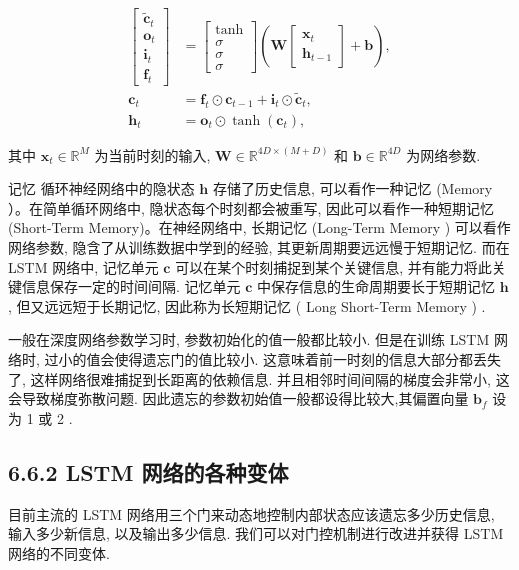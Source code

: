 \documentclass[10pt]{article}
\begin{document}
\begin{align*}
{\left[\begin{array}{c}
\tilde{\boldsymbol{c}}_{t} \\
\boldsymbol{o}_{t} \\
\boldsymbol{i}_{t} \\
\boldsymbol{f}_{t}
\end{array}\right] } & =\left[\begin{array}{c}
\tanh \\
\sigma \\
\sigma \\
\sigma
\end{array}\right]\left(\boldsymbol{W}\left[\begin{array}{c}
\boldsymbol{x}_{t} \\
\boldsymbol{h}_{t-1}
\end{array}\right]+\boldsymbol{b}\right),  \tag{6.57}\\
\boldsymbol{c}_{t} & =\boldsymbol{f}_{t} \odot \boldsymbol{c}_{t-1}+\boldsymbol{i}_{t} \odot \tilde{\boldsymbol{c}}_{t},  \tag{6.58}\\
\boldsymbol{h}_{t} & =\boldsymbol{o}_{t} \odot \tanh \left(\boldsymbol{c}_{t}\right), \tag{6.59}
\end{align*}


其中 $\boldsymbol{x}_{t} \in \mathbb{R}^{M}$ 为当前时刻的输入, $\boldsymbol{W} \in \mathbb{R}^{4 D \times(M+D)}$ 和 $\boldsymbol{b} \in \mathbb{R}^{4 D}$ 为网络参数.

记忆 循环神经网络中的隐状态 $\boldsymbol{h}$ 存储了历史信息, 可以看作一种记忆 (Memory ）。在简单循环网络中, 隐状态每个时刻都会被重写, 因此可以看作一种短期记忆 (Short-Term Memory)。在神经网络中, 长期记忆 (Long-Term Memory ) 可以看作网络参数, 隐含了从训练数据中学到的经验, 其更新周期要远远慢于短期记忆. 而在 LSTM 网络中, 记忆单元 $\boldsymbol{c}$ 可以在某个时刻捕捉到某个关键信息, 并有能力将此关键信息保存一定的时间间隔. 记忆单元 $\boldsymbol{c}$ 中保存信息的生命周期要长于短期记忆 $\boldsymbol{h}$, 但又远远短于长期记忆, 因此称为长短期记忆 ( Long Short-Term Memory ) .

一般在深度网络参数学习时, 参数初始化的值一般都比较小. 但是在训练 LSTM 网络时, 过小的值会使得遗忘门的值比较小. 这意味着前一时刻的信息大部分都丢失了, 这样网络很难捕捉到长距离的依赖信息. 并且相邻时间间隔的梯度会非常小, 这会导致梯度弥散问题. 因此遗忘的参数初始值一般都设得比较大,其偏置向量 $\boldsymbol{b}_{f}$ 设为 1 或 2 .

\subsection*{6.6.2 LSTM 网络的各种变体}
目前主流的 LSTM 网络用三个门来动态地控制内部状态应该遗忘多少历史信息, 输入多少新信息, 以及输出多少信息. 我们可以对门控机制进行改进并获得 LSTM 网络的不同变体.
\end{document}
